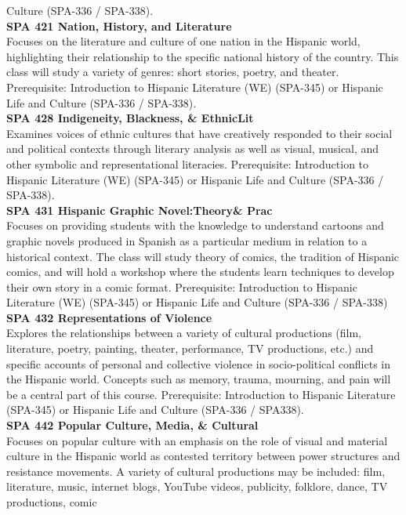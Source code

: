 \documentclass[
  letterpaper,
]{scrbook}
\begin{document}
Culture (SPA-336 / SPA-338).\\
\textbf{SPA 421 Nation, History, and Literature}\\
Focuses on the literature and culture of one nation in the Hispanic
world, highlighting their relationship to the specific national history
of the country. This class will study a variety of genres: short
stories, poetry, and theater. Prerequisite: Introduction to Hispanic
Literature (WE) (SPA-345) or Hispanic Life and Culture (SPA-336 /
SPA-338).\\
\textbf{SPA 428 Indigeneity, Blackness, \& EthnicLit}\\
Examines voices of ethnic cultures that have creatively responded to
their social and political contexts through literary analysis as well as
visual, musical, and other symbolic and representational literacies.
Prerequisite: Introduction to Hispanic Literature (WE) (SPA-345) or
Hispanic Life and Culture (SPA-336 / SPA-338).\\
\textbf{SPA 431 Hispanic Graphic Novel:Theory\& Prac}\\
Focuses on providing students with the knowledge to understand cartoons
and graphic novels produced in Spanish as a particular medium in
relation to a historical context. The class will study theory of comics,
the tradition of Hispanic comics, and will hold a workshop where the
students learn techniques to develop their own story in a comic format.
Prerequisite: Introduction to Hispanic Literature (WE) (SPA-345) or
Hispanic Life and Culture (SPA-336 / SPA-338)\\
\textbf{SPA 432 Representations of Violence}\\
Explores the relationships between a variety of cultural productions
(film, literature, poetry, painting, theater, performance, TV
productions, etc.) and specific accounts of personal and collective
violence in socio-political conflicts in the Hispanic world. Concepts
such as memory, trauma, mourning, and pain will be a central part of
this course. Prerequisite: Introduction to Hispanic Literature (SPA-345)
or Hispanic Life and Culture (SPA-336 / SPA338).\\
\textbf{SPA 442 Popular Culture, Media, \& Cultural}\\
Focuses on popular culture with an emphasis on the role of visual and
material culture in the Hispanic world as contested territory between
power structures and resistance movements. A variety of cultural
productions may be included: film, literature, music, internet blogs,
YouTube videos, publicity, folklore, dance, TV productions, comic
\end{document}
